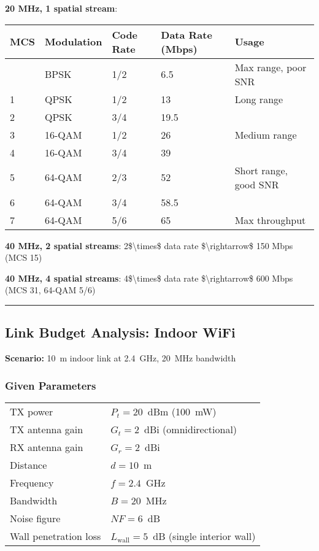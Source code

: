 \textbf{20 MHz, 1 spatial stream}:

{\def\LTcaptype{} %
\begin{longtable}[]{@{}lllll@{}}
\toprule\noalign{}
MCS & Modulation & Code Rate & Data Rate (Mbps) & Usage \\
\midrule\noalign{}
\endhead
\bottomrule\noalign{}
\endlastfoot
0 & BPSK & 1/2 & 6.5 & Max range, poor SNR \\
1 & QPSK & 1/2 & 13 & Long range \\
2 & QPSK & 3/4 & 19.5 & \\
3 & 16-QAM & 1/2 & 26 & Medium range \\
4 & 16-QAM & 3/4 & 39 & \\
5 & 64-QAM & 2/3 & 52 & Short range, good SNR \\
6 & 64-QAM & 3/4 & 58.5 & \\
7 & 64-QAM & 5/6 & 65 & Max throughput \\
\end{longtable}
}

\textbf{40 MHz, 2 spatial streams}: 2\$\textbackslash times\$ data rate
\$\textbackslash rightarrow\$ 150 Mbps (MCS 15)

\textbf{40 MHz, 4 spatial streams}: 4\$\textbackslash times\$ data rate
\$\textbackslash rightarrow\$ 600 Mbps (MCS 31, 64-QAM 5/6)

\begin{center}\rule{0.5\linewidth}{0.5pt}\end{center}

\subsection{Link Budget Analysis: Indoor WiFi}

\textbf{Scenario:} 10~m indoor link at 2.4~GHz, 20~MHz bandwidth

\subsubsection*{Given Parameters}

\begin{tabular}{@{}ll@{}}
TX power & $P_t = 20$~dBm (100~mW) \\
TX antenna gain & $G_t = 2$~dBi (omnidirectional) \\
RX antenna gain & $G_r = 2$~dBi \\
Distance & $d = 10$~m \\
Frequency & $f = 2.4$~GHz \\
Bandwidth & $B = 20$~MHz \\
Noise figure & $NF = 6$~dB \\
Wall penetration loss & $L_{\text{wall}} = 5$~dB (single interior wall) \\
\end{tabular}

